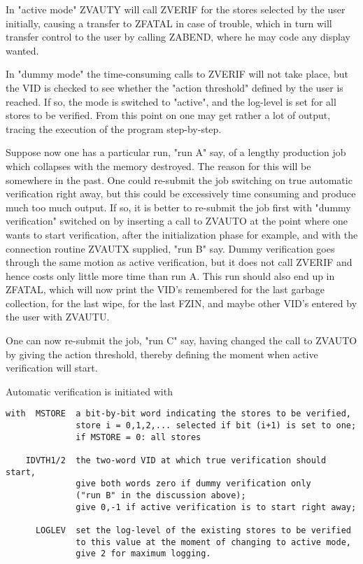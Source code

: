 In "active mode" ZVAUTY will call ZVERIF for the stores selected
by the user initially, causing a transfer to ZFATAL in case of trouble,
which in turn will transfer control to the user by calling ZABEND,
where he may code any display wanted.

In "dummy mode" the time-consuming calls to ZVERIF will not take place,
but the VID is checked to see whether the "action threshold" defined
by the user is reached. If so, the mode is switched to "active", and
the log-level is set for all stores to be verified.
From this point on one may get rather a lot of output, tracing the
execution of the program step-by-step.

Suppose now one has a particular run, "run A" say, of a lengthy
production job which collapses with the memory destroyed.
The reason for this will be somewhere in the past.
One could re-submit the job switching on true automatic verification 
right away, but this could be excessively time consuming and produce
much too much output.
If so, it is better to re-submit the job first with "dummy verification"
switched on by inserting a call to ZVAUTO at the point where one wants
to start verification, after the initialization phase for example,
and with the connection routine ZVAUTX supplied,
"run B" say.
Dummy verification goes through the
same motion as active verification, but it does not call ZVERIF
and hence costs only little more time than run A. This run should also
end up in ZFATAL, which will now print the VID's remembered for the last
garbage collection, for the last wipe, for the last FZIN,
and maybe other VID's entered by the user with ZVAUTU.

One can now re-submit the job, "run C" say, having changed the call to
ZVAUTO by giving the action threshold, thereby defining the moment
when active verification will start.

Automatic verification is initiated with


\begin{verbatim}
with  MSTORE  a bit-by-bit word indicating the stores to be verified,
              store i = 0,1,2,... selected if bit (i+1) is set to one;
              if MSTORE = 0: all stores

    IDVTH1/2  the two-word VID at which true verification should start,
              give both words zero if dummy verification only
              ("run B" in the discussion above);
              give 0,-1 if active verification is to start right away;

      LOGLEV  set the log-level of the existing stores to be verified
              to this value at the moment of changing to active mode,
              give 2 for maximum logging.
\end{verbatim} 


